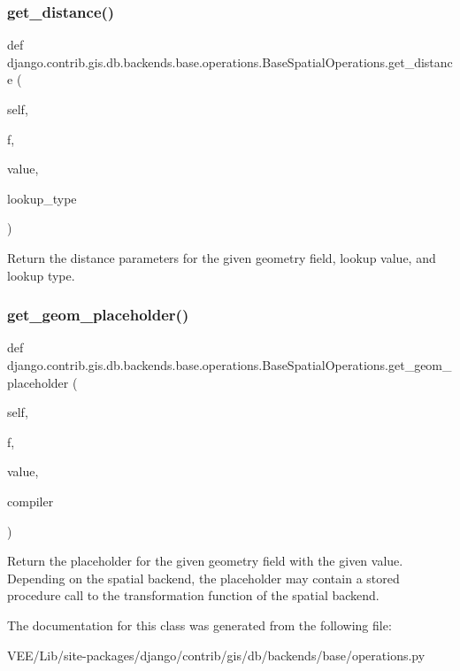 \subsubsection{\texorpdfstring{get\+\_\+distance()}{get\_distance()}}
{\footnotesize\ttfamily def django.\+contrib.\+gis.\+db.\+backends.\+base.\+operations.\+Base\+Spatial\+Operations.\+get\+\_\+distance (\begin{DoxyParamCaption}\item[{}]{self,  }\item[{}]{f,  }\item[{}]{value,  }\item[{}]{lookup\+\_\+type }\end{DoxyParamCaption})}

\begin{DoxyVerb}Return the distance parameters for the given geometry field,
lookup value, and lookup type.
\end{DoxyVerb}
 \mbox{\label{classdjango_1_1contrib_1_1gis_1_1db_1_1backends_1_1base_1_1operations_1_1_base_spatial_operations_a90bf6a8c82e86a960e419e608a190d84}} 
\subsubsection{\texorpdfstring{get\+\_\+geom\+\_\+placeholder()}{get\_geom\_placeholder()}}
{\footnotesize\ttfamily def django.\+contrib.\+gis.\+db.\+backends.\+base.\+operations.\+Base\+Spatial\+Operations.\+get\+\_\+geom\+\_\+placeholder (\begin{DoxyParamCaption}\item[{}]{self,  }\item[{}]{f,  }\item[{}]{value,  }\item[{}]{compiler }\end{DoxyParamCaption})}

\begin{DoxyVerb}Return the placeholder for the given geometry field with the given
value.  Depending on the spatial backend, the placeholder may contain a
stored procedure call to the transformation function of the spatial
backend.
\end{DoxyVerb}
 

The documentation for this class was generated from the following file\+:\begin{DoxyCompactItemize}
\item 
V\+E\+E/\+Lib/site-\/packages/django/contrib/gis/db/backends/base/operations.\+py\end{DoxyCompactItemize}
